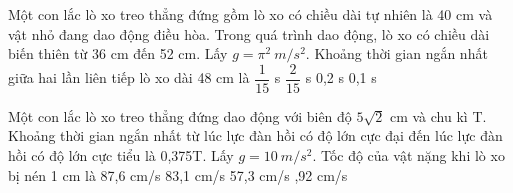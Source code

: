\begin{vidu}%
Một con lắc lò xo treo thẳng đứng gồm lò xo có chiều dài tự nhiên là 40 cm và vật nhỏ đang dao động điều hòa. Trong quá trình dao động, lò xo có chiều dài biến thiên từ 36 cm đến 52 cm. Lấy $g = \pi^2 \ m/s^2$. Khoảng thời gian ngắn nhất giữa hai lần liên tiếp lò xo dài 48 cm là
\choice
{$\dfrac{1}{15}$ s}
{\True $\dfrac{2}{15}$ s}
{0,2 s}
{0,1 s}
\end{vidu} %
\begin{vidu}%
Một con lắc lò xo treo thẳng đứng dao động với biên độ $5\sqrt{2}$ cm và chu kì T. Khoảng thời gian ngắn nhất từ lúc lực đàn hồi có độ lớn cực đại đến lúc lực đàn hồi có độ lớn cực tiểu là 0,375T. Lấy $g = 10\ m/s^2$. Tốc độ của vật nặng khi lò xo bị nén 1 cm là
\choice
{87,6 cm/s}
{83,1 cm/s}
{57,3 cm/s}
{,92 cm/s}
\end{vidu} %
















